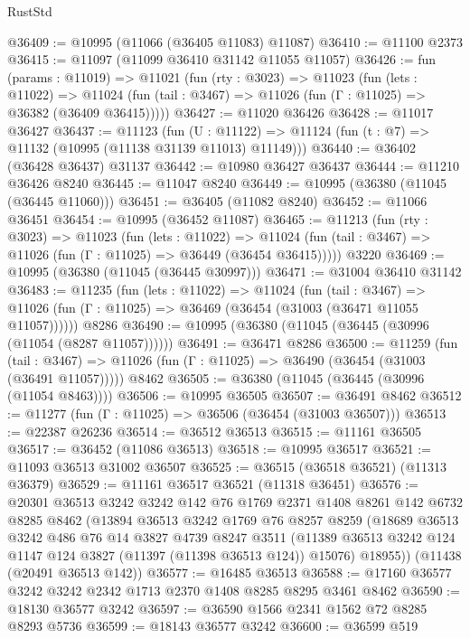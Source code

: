 \begin{lexlean}{RustStd}
\begin{coremodule}
@36409 := @10995 (@11066 (@36405 @11083) @11087)
@36410 := @11100 @2373
@36415 := @11097 (@11099 @36410 @31142 @11055 @11057)
@36426 := fun (params : @11019) =>
  @11021
    (fun (rty : @3023) =>
    @11023
      (fun (lets : @11022) =>
      @11024 (fun (tail : @3467) => @11026 (fun (Γ : @11025) => @36382 (@36409 @36415)))))
@36427 := @11020 @36426
@36428 := @11017 @36427
@36437 := @11123
    (fun (U : @11122) => @11124 (fun (t : @7) => @11132 (@10995 (@11138 @31139 @11013) @11149)))
@36440 := @36402 (@36428 @36437) @31137
@36442 := @10980 @36427 @36437
@36444 := @11210 @36426 @8240
@36445 := @11047 @8240
@36449 := @10995 (@36380 (@11045 (@36445 @11060)))
@36451 := @36405 (@11082 @8240)
@36452 := @11066 @36451
@36454 := @10995 (@36452 @11087)
@36465 := @11213
    (fun (rty : @3023) =>
    @11023
      (fun (lets : @11022) =>
      @11024 (fun (tail : @3467) => @11026 (fun (Γ : @11025) => @36449 (@36454 @36415)))))
    @3220
@36469 := @10995 (@36380 (@11045 (@36445 @30997)))
@36471 := @31004 @36410 @31142
@36483 := @11235
    (fun (lets : @11022) =>
    @11024
      (fun (tail : @3467) =>
      @11026 (fun (Γ : @11025) => @36469 (@36454 (@31003 (@36471 @11055 @11057))))))
    @8286
@36490 := @10995 (@36380 (@11045 (@36445 (@30996 (@11054 (@8287 @11057))))))
@36491 := @36471 @8286
@36500 := @11259
    (fun (tail : @3467) => @11026 (fun (Γ : @11025) => @36490 (@36454 (@31003 (@36491 @11057)))))
    @8462
@36505 := @36380 (@11045 (@36445 (@30996 (@11054 @8463))))
@36506 := @10995 @36505
@36507 := @36491 @8462
@36512 := @11277 (fun (Γ : @11025) => @36506 (@36454 (@31003 @36507)))
@36513 := @22387 @26236
@36514 := @36512 @36513
@36515 := @11161 @36505
@36517 := @36452 (@11086 @36513)
@36518 := @10995 @36517
@36521 := @11093 @36513 @31002 @36507
@36525 := @36515 (@36518 @36521) (@11313 @36379)
@36529 := @11161 @36517 @36521 (@11318 @36451)
@36576 := @20301
    @36513
    @3242
    @3242
    @142
    @76
    @1769
    @2371
    @1408
    @8261
    @142
    @6732
    @8285
    @8462
    (@13894
      @36513
      @3242
      @1769
      @76
      @8257
      @8259
      (@18689
        @36513
        @3242
        @486
        @76
        @14
        @3827
        @4739
        @8247
        @3511
        (@11389 @36513 @3242 @124 @1147 @124 @3827 (@11397 (@11398 @36513 @124)) @15076)
        @18955))
    (@11438 (@20491 @36513 @142))
@36577 := @16485 @36513
@36588 := @17160 @36577 @3242 @3242 @2342 @1713 @2370 @1408 @8285 @8295 @3461 @8462
@36590 := @18130 @36577 @3242
@36597 := @36590 @1566 @2341 @1562 @72 @8285 @8293 @5736
@36599 := @18143 @36577 @3242
@36600 := @36599 @519

\end{coremodule}
\end{lexlean}
